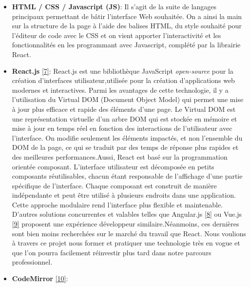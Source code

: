 \documentclass[
  12pt,
]{article}
\begin{document}
\begin{itemize}
  \item
        \textbf{HTML / CSS / Javascript (JS)}: Il s'agit de la suite de
        langages principaux permettant de bâtir l'interface Web souhaitée. On
        a ainsi la main sur la structure de la page à l'aide des balises HTML,
        du style souhaité pour l'éditeur de code avec le CSS et on vient
        apporter l'interactivité et les fonctionnalités en les programmant
        avec Javascript, complété par la librairie React.
  \item
        \textbf{React.js} \protect\hyperlink{ref-react}{{[}7{]}}: React.js est
        une bibliothèque JavaScript \emph{open-source} pour la création
        d'interfaces utilisateur,utilisée pour la création d'applications web
        modernes et interactives. Parmi les avantages de cette technologie, il
        y a l'utilisation du Virtual DOM (Document Object Model) qui permet
        une mise à jour plus efficace et rapide des éléments d'une page. Le
        Virtual DOM est une représentation virtuelle d'un arbre DOM qui est
        stockée en mémoire et mise à jour en temps réel en fonction des
        interactions de l'utilisateur avec l'interface. On modifie seulement
        les éléments impactés, et non l'ensemble du DOM de la page, ce qui se
        traduit par des temps de réponse plus rapides et des meilleures
        performances.\newline  Aussi, React est basé sur la programmation
        orientée composant. L'interface utilisateur est décomposée en petits
        composants réutilisables, chacun étant responsable de l'affichage
        d'une partie spécifique de l'interface. Chaque composant est construit
        de manière indépendante et peut être utilisé à plusieurs endroits dans
        une application. Cette approche modulaire rend l'interface plus
        flexible et maintenable. D'autres solutions concurrentes et valables
        telles que Angular.js \protect\hyperlink{ref-angularjs}{{[}8{]}} ou
        Vue.js \protect\hyperlink{ref-vuejs}{{[}9{]}} proposent une expérience
        développeur similaire.\newline  Néanmoins, ces dernières sont bien
        moins recherchées sur le marché du travail que React. Nous voulions à
        travers ce projet nous former et pratiquer une technologie très en
        vogue et que l'on pourra facilement réinvestir plus tard dans notre
        parcours professionnel.
  \item
        \textbf{CodeMirror} \protect\hyperlink{ref-codemirror}{{[}10{]}}:

\end{itemize}
\end{document}
